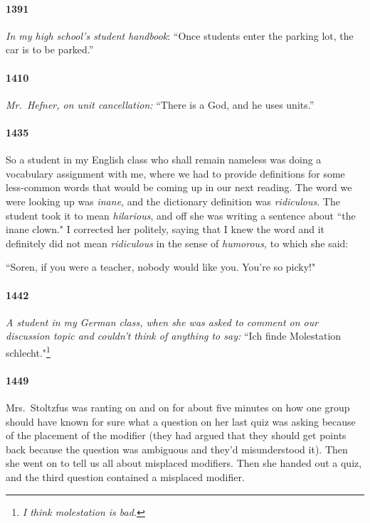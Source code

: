 \documentclass[10pt]{memoir}
\newcommand{\intro}[1]{\emph{#1}}
\begin{document}
\paragraph{1391} \intro{In my high school's student handbook}: ``Once students enter the parking lot, the car is to be parked.''

\paragraph{1410} \intro{Mr.\ Hefner, on unit cancellation:} ``There is a God, and he uses units.''

\paragraph{1435} So a student in my English class who shall remain nameless was doing a vocabulary assignment with me, where we had to provide definitions for some less-common words that would be coming up in our next reading. The word we were looking up was \emph{inane}, and the dictionary definition was \emph{ridiculous}. The student took it to mean \emph{hilarious}, and off she was writing a sentence about ``the inane clown." I corrected her politely, saying that I knew the word and it definitely did not mean \emph{ridiculous} in the sense of \emph{humorous,} to which she said:

``Soren, if you were a teacher, nobody would like you. You're so picky!"

\paragraph{1442} \intro{A student in my German class, when she was asked to comment on our discussion topic and couldn't think of anything to say:} ``Ich finde Molestation schlecht."\thinspace\footnote{\emph{I think molestation is bad.}}

\paragraph{1449} Mrs.\ Stoltzfus was ranting on and on for about five minutes on how one group should have known for sure what a question on her last quiz was asking because of the placement of the modifier (they had argued that they should get points back because the question was ambiguous and they'd misunderstood it). Then she went on to tell us all about misplaced modifiers. Then she handed out a quiz, and the third question contained a misplaced modifier.
\end{document}
